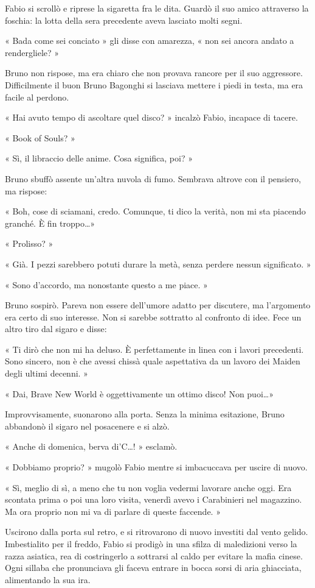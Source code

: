 Fabio si scrollò e riprese la sigaretta fra le dita. Guardò il suo amico attraverso la foschia: la lotta della sera precedente aveva lasciato molti segni.

« Bada come sei conciato » gli disse con amarezza, « non sei ancora andato a rendergliele? »

Bruno non rispose, ma era chiaro che non provava rancore per il suo aggressore. Difficilmente il buon Bruno Bagonghi si lasciava mettere i piedi in testa, ma era facile al perdono.

« Hai avuto tempo di ascoltare quel disco? » incalzò Fabio, incapace di tacere.

« Book of Souls? »

« Sì, il libraccio delle anime. Cosa significa, poi? »

Bruno sbuffò assente un'altra nuvola di fumo. Sembrava altrove con il pensiero, ma rispose:

« Boh, cose di sciamani, credo. Comunque, ti dico la verità, non mi sta piacendo granché. È fin troppo\ldots »

« Prolisso? »

« Già. I pezzi sarebbero potuti durare la metà, senza perdere nessun significato. »

« Sono d'accordo, ma nonostante questo a me piace. »

Bruno sospirò. Pareva non essere dell'umore adatto per discutere, ma l'argomento era certo di suo interesse. Non si sarebbe sottratto al confronto di idee. Fece un altro tiro dal sigaro e disse:

« Ti dirò che non mi ha deluso. È perfettamente in linea con i lavori precedenti. Sono sincero, non è che avessi chissà quale aspettativa da un lavoro dei Maiden degli ultimi decenni. »

« Dai, Brave New World è oggettivamente un ottimo disco! Non puoi\ldots »

Improvvisamente, suonarono alla porta. Senza la minima esitazione, Bruno abbandonò il sigaro nel posacenere e si alzò.

« Anche di domenica, berva di'C\ldots! » esclamò.

« Dobbiamo proprio? » mugolò Fabio mentre si imbacuccava per uscire di nuovo.

« Sì, meglio di sì, a meno che tu non voglia vedermi lavorare anche oggi. Era scontata prima o poi una loro visita, venerdì avevo i Carabinieri nel magazzino. Ma ora proprio non mi va di parlare di queste faccende. »

Uscirono dalla porta sul retro, e si ritrovarono di nuovo investiti dal vento gelido. Imbestialito per il freddo, Fabio si prodigò in una sfilza di maledizioni verso la razza asiatica, rea di costringerlo a sottrarsi al caldo per evitare la mafia cinese. Ogni sillaba che pronunciava gli faceva entrare in bocca sorsi di aria ghiacciata, alimentando la sua ira.

